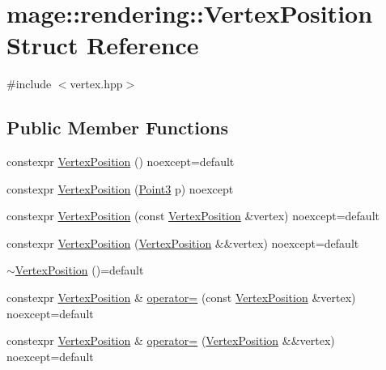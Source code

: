 \hypertarget{structmage_1_1rendering_1_1_vertex_position}{}\section{mage\+:\+:rendering\+:\+:Vertex\+Position Struct Reference}
\label{structmage_1_1rendering_1_1_vertex_position}


{\ttfamily \#include $<$vertex.\+hpp$>$}

\subsection*{Public Member Functions}
\begin{DoxyCompactItemize}
\item 
constexpr \mbox{\hyperlink{structmage_1_1rendering_1_1_vertex_position_a9df4fa391d76a89997e8b512fc3142d2}{Vertex\+Position}} () noexcept=default
\item 
constexpr \mbox{\hyperlink{structmage_1_1rendering_1_1_vertex_position_afeb47bb7062e42f0bdaf7039abc4b7cb}{Vertex\+Position}} (\mbox{\hyperlink{structmage_1_1_point3}{Point3}} p) noexcept
\item 
constexpr \mbox{\hyperlink{structmage_1_1rendering_1_1_vertex_position_a2f93e143d8e24b4de51eea1e73e8ad62}{Vertex\+Position}} (const \mbox{\hyperlink{structmage_1_1rendering_1_1_vertex_position}{Vertex\+Position}} \&vertex) noexcept=default
\item 
constexpr \mbox{\hyperlink{structmage_1_1rendering_1_1_vertex_position_ad886c8131e6cf96dac4a716907b532ad}{Vertex\+Position}} (\mbox{\hyperlink{structmage_1_1rendering_1_1_vertex_position}{Vertex\+Position}} \&\&vertex) noexcept=default
\item 
\mbox{\hyperlink{structmage_1_1rendering_1_1_vertex_position_afe5c10d9422cd3b37acecd3691361057}{$\sim$\+Vertex\+Position}} ()=default
\item 
constexpr \mbox{\hyperlink{structmage_1_1rendering_1_1_vertex_position}{Vertex\+Position}} \& \mbox{\hyperlink{structmage_1_1rendering_1_1_vertex_position_a9b25981be6c9b46f6c8c4dbc0c143fc6}{operator=}} (const \mbox{\hyperlink{structmage_1_1rendering_1_1_vertex_position}{Vertex\+Position}} \&vertex) noexcept=default
\item 
constexpr \mbox{\hyperlink{structmage_1_1rendering_1_1_vertex_position}{Vertex\+Position}} \& \mbox{\hyperlink{structmage_1_1rendering_1_1_vertex_position_a1bb8da5039eae002fbfc446a5a4d8c4a}{operator=}} (\mbox{\hyperlink{structmage_1_1rendering_1_1_vertex_position}{Vertex\+Position}} \&\&vertex) noexcept=default
\end{DoxyCompactItemize}

